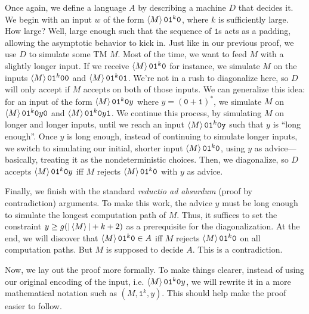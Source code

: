 \begin{proofidea}
  Once again, we define a language $A$ by describing a machine $D$ that decides it. We begin with an input $w$ of the form $\left< M \right>\texttt{0}\texttt{1}^k\texttt{0}$, where $k$ is sufficiently large. How large? Well, large enough such that the sequence of $\texttt{1}$s acts as a padding, allowing the asymptotic behavior to kick in. Just like in our previous proof, we use $D$ to simulate some TM $M$. Most of the time, we want to feed $M$ with a slightly longer input. If we receive $\left< M \right>\texttt{0}\texttt{1}^k\texttt{0}$ for instance, we simulate $M$ on the inputs $\left< M \right>\texttt{0}\texttt{1}^{k}\texttt{0}\texttt{0}$ and $\left< M \right>\texttt{0}\texttt{1}^{k}\texttt{0}\texttt{1}$. We're not in a rush to diagonalize here, so $D$ will only accept if $M$ accepts on both of those inputs. We can generalize this idea: for an input of the form $\left< M \right>\texttt{0}\texttt{1}^{k}\texttt{0}y$ where $y = (\texttt{0} + \texttt{1})^\ast$, we simulate $M$ on $\left< M \right>\texttt{0}\texttt{1}^{k}\texttt{0}y\texttt{0}$ and $\left< M \right>\texttt{0}\texttt{1}^{k}\texttt{0}y\texttt{1}$. We continue this process, by simulating $M$ on longer and longer inputs, until we reach an input $\left< M \right>\texttt{0}\texttt{1}^k\texttt{0}\texttt{y}$ such that $y$ is ``long enough''. Once $y$ is long enough, instead of continuing to simulate longer inputs, we switch to simulating our initial, shorter input $\left< M \right>\texttt{0}\texttt{1}^k\texttt{0}$, using $y$ as advice—basically, treating it as the nondeterministic choices. Then, we diagonalize, so $D$ accepts $\left< M \right>\texttt{0}\texttt{1}^k\texttt{0}y$ iff $M$ rejects $\left< M \right>\texttt{0}\texttt{1}^k\texttt{0}$ with $y$ as advice.

  Finally, we finish with the standard \textit{reductio ad absurdum} (proof by contradiction) arguments. To make this work, the advice $y$ must be long enough to simulate the longest computation path of $M$. Thus, it suffices to set the constraint $y \geq g(| \left< M \right> | + k + 2)$ as a prerequisite for the diagonalization. At the end, we will discover that $\left< M \right>\texttt{0}\texttt{1}^k\texttt{0} \in A$ iff $M$ rejects $\left< M \right>\texttt{0}\texttt{1}^k\texttt{0}$ on all computation paths. But $M$ is supposed to decide $A$. This is a contradiction.
\end{proofidea}

Now, we lay out the proof more formally. To make things clearer, instead of using our original encoding of the input, i.e. $\left< M \right>\texttt{0}\texttt{1}^k\texttt{0}y$, we will rewrite it in a more mathematical notation such as $(M, \texttt{1}^k, y)$. This should help make the proof easier to follow.

